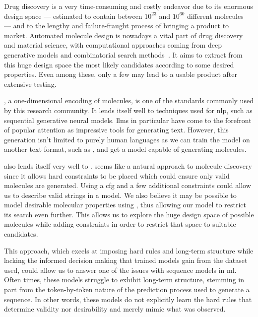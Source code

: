 \documentclass[../Document.tex]{subfiles}
\begin{document}
\label{chap:introduction}

Drug discovery is a very time-consuming and costly endeavor due to its enormous design space
--- estimated to contain between $10^{23}$ and $10^{60}$ different molecules~\cite{molecule-space} --- and to the lengthy and failure-fraught process of bringing a product to market.
Automated molecule design is nowadays a vital part of drug discovery and material science, with computational approaches coming from deep generative models and combinatorial search methods~\cite{du2022molgensurvey}.
It aims to extract from this huge design space the most likely candidates according to some desired properties.
Even among these, only a few may lead to a usable product after extensive testing.

\smiles, a one-dimensional encoding of molecules, is one of the standards commonly used by this research community.
It lends itself well to techniques used for \gls{nlp}, such as sequential generative neural models.
\glspl{llm} in particular have come to the forefront of popular attention as impressive tools for generating text.
However, this generation isn't limited to purely human languages as we can train the model on another text format, such as \smiles, and get a model capable of generating molecules.

\smiles also lends itself very well to \cp. \cp seems like a natural approach to molecule discovery since it allows hard constraints to be placed which could ensure only valid molecules are generated.
Using a \gls{cfg} and a few additional constraints could allow us to describe valid \smiles strings in a \cp model.
We also believe it may be possible to model desirable molecular properties using \cp, thus allowing our model to restrict its search even further.
This allows us to explore the huge design space of possible molecules while adding constraints in order to restrict that space to suitable candidates.

This \cp approach, which excels at imposing hard rules and long-term structure while lacking the informed decision making that trained models gain from the dataset used, could allow us to answer one of the issues with sequence models in \gls{ml}.
Often times, these models struggle to exhibit long-term structure, stemming in part from the token-by-token nature of the prediction process used to generate a sequence.
In other words, these models do not explicitly learn the hard rules that determine validity nor desirability and merely mimic what was observed.
\end{document}
